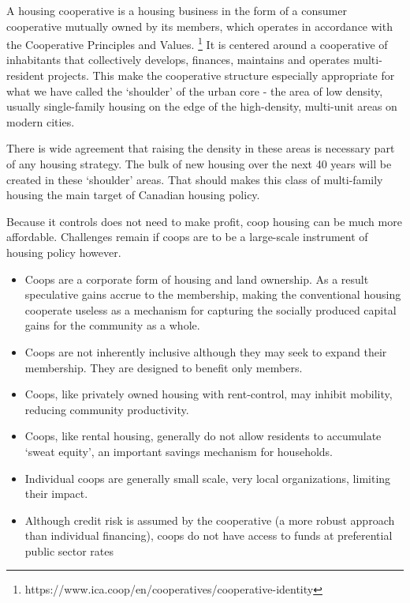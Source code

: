  A housing cooperative is a housing business in the form of a consumer cooperative mutually owned by its members, which operates in accordance with the Cooperative Principles and Values. 
 \footnote{https://www.ica.coop/en/cooperatives/cooperative-identity}
  It is centered around a cooperative of inhabitants that collectively develops, finances, maintains and operates multi-resident projects. This make the cooperative structure  especially appropriate for what we have called the `shoulder' of the urban core - the area of low density, usually single-family housing on the edge of the high-density, multi-unit areas on modern cities. 
 
 There is wide agreement that raising the density in these areas is necessary part of any housing strategy. The bulk of new housing over the next 40 years will be created in these `shoulder' areas. That should makes this class of multi-family housing the main target of Canadian housing policy. 
 
 Because it controls  does not need to make profit, coop housing can be much more affordable. Challenges remain if coops are to be a large-scale instrument of housing policy however. 
 
 \begin{itemize}
     \item Coops are a corporate form of housing and land ownership. As a result speculative gains accrue to the membership, making the conventional housing cooperate useless as a mechanism for capturing the socially produced capital gains for the community as a whole.
     \item Coops are not inherently inclusive although they may seek to expand their membership. They are designed to benefit only members. 

     \item Coops, like privately owned housing with rent-control, may inhibit mobility, reducing community productivity.
     \item Coops, like rental housing, generally do not allow residents to accumulate    `sweat equity', an important savings mechanism for  households.
     \item Individual coops are generally small scale, very local organizations, limiting their impact.
     \item Although credit risk is assumed by the cooperative  (a more robust approach than individual financing), coops do not have access to funds at preferential public sector rates
 \end{itemize}

